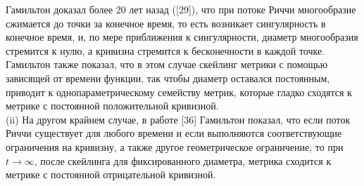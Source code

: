 Гамильтон доказал более 20 лет назад ([29]), что при потоке Риччи 
многообразие сжимается до точки за конечное время, то есть возникает 
сингулярность в конечное время, и, по мере приближения к сингулярности, 
диаметр многообразия стремится к нулю, а кривизна стремится к 
бесконечности в каждой точке. Гамильтон также показал, что в этом 
случае скейлинг метрики с помощью зависящей от времени функции, 
так чтобы диаметр оставался постоянным, приводит к однопараметрическому 
семейству метрик, которые гладко сходятся к метрике с постоянной 
положительной кривизной.\\
(ii) На другом крайнем случае, в работе [36] Гамильтон показал, что если 
поток Риччи существует для любого времени и если выполняются 
соответствующие ограничения на кривизну, а также другое геометрическое 
ограничение, то при $t \rightarrow \infty$, после скейлинга для фиксированного 
диаметра, метрика сходится к метрике с постоянной отрицательной кривизной.

